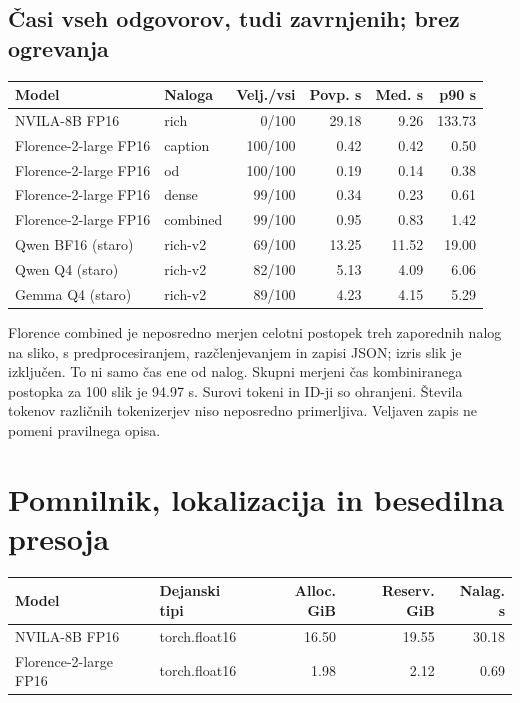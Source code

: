 \subsection*{Časi vseh odgovorov, tudi zavrnjenih; brez ogrevanja}
\begin{center}\small\begin{tabular}{p{3.4cm}p{3.1cm}rrrr}\toprule
Model & Naloga & Velj./vsi & Povp. s & Med. s & p90 s \\ \midrule
NVILA-8B FP16 & rich & 0/100 & 29.18 & 9.26 & 133.73 \\
Florence-2-large FP16 & caption & 100/100 & 0.42 & 0.42 & 0.50 \\
Florence-2-large FP16 & od & 100/100 & 0.19 & 0.14 & 0.38 \\
Florence-2-large FP16 & dense & 99/100 & 0.34 & 0.23 & 0.61 \\
Florence-2-large FP16 & combined & 99/100 & 0.95 & 0.83 & 1.42 \\
Qwen BF16 (staro) & rich-v2 & 69/100 & 13.25 & 11.52 & 19.00 \\
Qwen Q4 (staro) & rich-v2 & 82/100 & 5.13 & 4.09 & 6.06 \\
Gemma Q4 (staro) & rich-v2 & 89/100 & 4.23 & 4.15 & 5.29 \\
\bottomrule\end{tabular}\end{center}

Florence combined je neposredno merjen celotni postopek treh zaporednih nalog na sliko, s predprocesiranjem, razčlenjevanjem in zapisi JSON; izris slik je izključen. To ni samo čas ene od nalog. Skupni merjeni čas kombiniranega postopka za 100 slik je 94.97 s. Surovi tokeni in ID-ji so ohranjeni. Števila tokenov različnih tokenizerjev niso neposredno primerljiva. Veljaven zapis ne pomeni pravilnega opisa.

\newpage
\section*{Pomnilnik, lokalizacija in besedilna presoja}
\begin{center}\small\begin{tabular}{p{4cm}p{3.8cm}rrr}\toprule
Model & Dejanski tipi & Alloc. GiB & Reserv. GiB & Nalag. s \\ \midrule
NVILA-8B FP16 & torch.float16 & 16.50 & 19.55 & 30.18 \\
Florence-2-large FP16 & torch.float16 & 1.98 & 2.12 & 0.69 \\
\bottomrule\end{tabular}\end{center}

